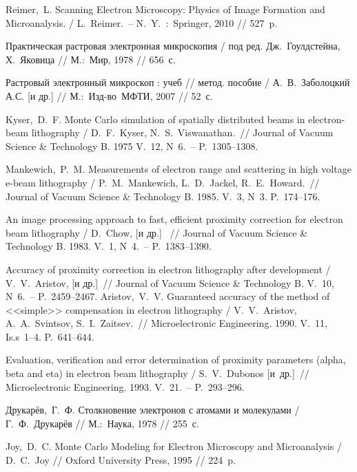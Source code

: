 \begin{thebibliography}{99}
\begin{thebibliography}{99}

 \tabfix Reimer,~L. Scanning Electron Microscopy: Physics of Image Formation
and Microanalysis. / L.~Reimer.~-- N.~Y.~:~Springer, 2010 // 527~p.

 \tabfix Практическая растровая электронная микроскопия / под ред.
Дж.~Гоулдстейна, Х.~Яковица // М.:~Мир, 1978 // 656~с.

 \tabfix Растровый электронный микроскоп : учеб // метод. пособие /
А.~В.~Заболоцкий А.С. [и др.] // М.:~Изд-во~МФТИ, 2007 //
52~с. %

 \tabfix Kyser,~D.~F. Monte Carlo simulation of spatially
distributed beams in electron-beam lithography / D.~F.~Kyser,
N.~S.~Viswanathan.~// Journal of Vacuum Science \& Technology B. 1975 V.~12,
N~6.~-- P.~1305--1308.

 \tabfix Mankewich,~P.~M. Measurements of electron range and scattering in
high voltage e-beam lithography / P.~M.~Mankewich, L.~D.~Jackel,
R.~E.~Howard.~// Journal of Vacuum Science \& Technology B. 1985. V.~3, N~3.
P.~174--176.

 \tabfix An image processing approach to fast, efficient proximity correction for
electron beam lithography / D.~Chow, [и др.] ~// Journal of Vacuum Science \& Technology B. 1983.
V.~1, N~4.~-- P.~1383--1390.%

 \tabfix Accuracy of proximity correction in electron lithography after
development / V.~V.~Aristov, [и др.]~// Journal of Vacuum Science \& Technology B. V.~10,
N~6.~-- P.~2459--2467.
 \tabfix Aristov,~V.~V. Guaranteed accuracy of the method of <<simple>>
compensation in electron lithography / V.~V.~Aristov, A.~A.~Svintsov,
S.~I.~Zaitsev.~// Microelectronic Engineering. 1990. V.~11, Is.s~1--4.
P.~641--644.

 \tabfix Evaluation, verification and error determination of proximity
parameters (alpha, beta and eta) in electron beam lithography / S.~V.~Dubonos [и~др.]~// Microelectronic
Engineering. 1993. V.~21.~-- P.~293--296.%

 \tabfix Друкарёв,~Г.~Ф. Столкновение электронов с атомами и молекулами /
Г.~Ф.~Друкарёв // М.:~Наука, 1978 // 255~с.

 \tabfix Joy,~D.~C. Monte Carlo Modeling for Electron Microscopy and
Microanalysis / D.~C.~Joy // Oxford University Press, 1995 // 224~p.


\end{thebibliography}
\end{thebibliography}
